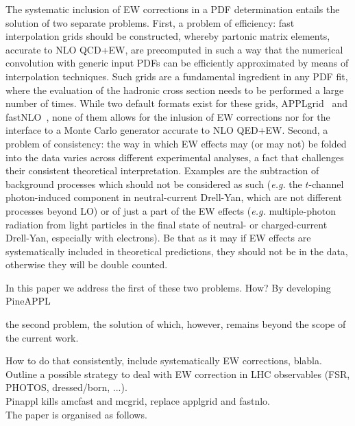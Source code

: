 The systematic inclusion of EW corrections in a PDF determination entails
the solution of two separate problems. First, a problem of efficiency:
fast interpolation grids should be constructed, whereby partonic matrix 
elements, accurate to NLO QCD+EW, are precomputed in such a way that the 
numerical convolution with generic input PDFs can be efficiently approximated
by means of interpolation techniques. Such grids are a fundamental ingredient
in any PDF fit, where the evaluation of the hadronic cross section needs to 
be performed a large number of times. While two default formats exist for
these grids, {\sc APPLgrid}~\cite{Carli:2010rw} and 
{\sc fastNLO}~\cite{Kluge:2006xs}, none of them allows for the inlusion of EW
corrections nor for the interface to a Monte Carlo generator accurate to 
NLO QED+EW. Second, a problem of consistency: the way in which EW effects may
(or may not) be folded into the data varies across different experimental 
analyses, a fact that challenges their consistent theoretical interpretation. 
Examples are the subtraction of background processes which should not be 
considered as such ({\it e.g.} the $t$-channel photon-induced component in 
neutral-current Drell-Yan, which are not different processes beyond LO) or of 
just a part of the EW effects ({\it e.g.} multiple-photon radiation from light 
particles in the final state of neutral- or charged-current Drell-Yan, 
especially with electrons). Be that as it may if EW effects are systematically
included in theoretical predictions, they should not be in the data,
otherwise they will be double counted.

In this paper we address the first of these two problems.
How? By developing {\sc PineAPPL}

the second problem, the solution of which, however, remains beyond the scope of 
the current work.

How to do that consistently, include systematically EW corrections, blabla.\\
Outline a possible strategy to deal with EW correction in LHC observables (FSR, PHOTOS, dressed/born, ...).\\
Pinappl kills amcfast and mcgrid, replace applgrid and fastnlo.\\

The paper is organised as follows.

